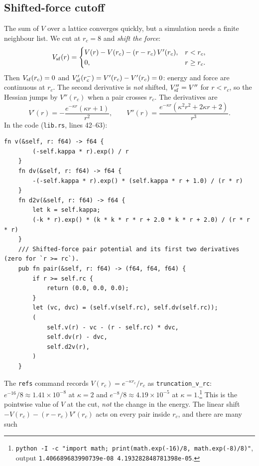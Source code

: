 \subsection{Shifted-force cutoff}
The sum of $V$ over a lattice converges quickly, but a simulation needs a finite neighbour list. We cut at $r_c=8$
and \emph{shift the force}:
\begin{equation}\label{eq:vsf}
V_{\rm sf}(r)=\begin{cases}V(r)-V(r_c)-(r-r_c)\,V'(r_c), & r<r_c,\\ 0, & r\ge r_c.\end{cases}
\end{equation}
Then $V_{\rm sf}(r_c)=0$ and $V_{\rm sf}'(r_c^-)=V'(r_c)-V'(r_c)=0$: energy and force are continuous at $r_c$. The second
derivative is \emph{not} shifted, $V_{\rm sf}''=V''$ for $r<r_c$, so the Hessian jumps by $V''(r_c)$ when a pair
crosses $r_c$. The derivatives are
\begin{equation}\label{eq:vprime}
V'(r)=-\frac{e^{-\kappa r}(\kappa r+1)}{r^2},\qquad V''(r)=\frac{e^{-\kappa r}(\kappa^2r^2+2\kappa r+2)}{r^3}.
\end{equation}
In the code (\texttt{lib.rs}, lines 42--63):
\begin{lstlisting}[language={},title={lib.rs, lines 42--63}]
    fn v(&self, r: f64) -> f64 {
        (-self.kappa * r).exp() / r
    }
    fn dv(&self, r: f64) -> f64 {
        -(-self.kappa * r).exp() * (self.kappa * r + 1.0) / (r * r)
    }
    fn d2v(&self, r: f64) -> f64 {
        let k = self.kappa;
        (-k * r).exp() * (k * k * r * r + 2.0 * k * r + 2.0) / (r * r * r)
    }
    /// Shifted-force pair potential and its first two derivatives (zero for `r >= rc`).
    pub fn pair(&self, r: f64) -> (f64, f64, f64) {
        if r >= self.rc {
            return (0.0, 0.0, 0.0);
        }
        let (vc, dvc) = (self.v(self.rc), self.dv(self.rc));
        (
            self.v(r) - vc - (r - self.rc) * dvc,
            self.dv(r) - dvc,
            self.d2v(r),
        )
    }
\end{lstlisting}
The \texttt{refs} command records $V(r_c)=e^{-\kappa r_c}/r_c$ as \texttt{truncation\_v\_rc}:
$e^{-16}/8\approx1.41\times10^{-8}$ at $\kappa=2$ and $e^{-8}/8\approx4.19\times10^{-5}$ at
$\kappa=1$.\footnote{\texttt{python -I -c "import math; print(math.exp(-16)/8, math.exp(-8)/8)"}, output
\texttt{1.406689683990739e-08 4.193282848781398e-05}.} This is the pointwise value of $V$ at the cut, \emph{not} the
change in the energy. The linear shift $-V(r_c)-(r-r_c)V'(r_c)$ acts on every pair inside $r_c$, and there are many such
